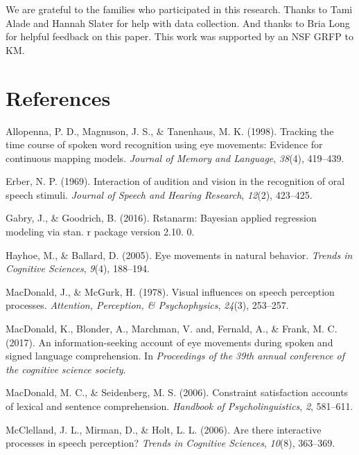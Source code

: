 \documentclass[10pt, letterpaper]{article}
\begin{document}
We are grateful to the families who participated in this research.
Thanks to Tami Alade and Hannah Slater for help with data collection.
And thanks to Bria Long for helpful feedback on this paper. This work
was supported by an NSF GRFP to KM.

\section{References}\label{references}

\setlength{\parindent}{-0.1in} \setlength{\leftskip}{0.125in} \noindent

\hypertarget{refs}{}
\hypertarget{ref-allopenna1998tracking}{}
Allopenna, P. D., Magnuson, J. S., \& Tanenhaus, M. K. (1998). Tracking
the time course of spoken word recognition using eye movements: Evidence
for continuous mapping models. \emph{Journal of Memory and Language},
\emph{38}(4), 419--439.

\hypertarget{ref-erber1969interaction}{}
Erber, N. P. (1969). Interaction of audition and vision in the
recognition of oral speech stimuli. \emph{Journal of Speech and Hearing
Research}, \emph{12}(2), 423--425.

\hypertarget{ref-gabry2016rstanarm}{}
Gabry, J., \& Goodrich, B. (2016). Rstanarm: Bayesian applied regression
modeling via stan. r package version 2.10. 0.

\hypertarget{ref-hayhoe2005eye}{}
Hayhoe, M., \& Ballard, D. (2005). Eye movements in natural behavior.
\emph{Trends in Cognitive Sciences}, \emph{9}(4), 188--194.

\hypertarget{ref-macdonald1978visual}{}
MacDonald, J., \& McGurk, H. (1978). Visual influences on speech
perception processes. \emph{Attention, Perception, \& Psychophysics},
\emph{24}(3), 253--257.

\hypertarget{ref-macdonald2017info}{}
MacDonald, K., Blonder, A., Marchman, V. and, Fernald, A., \& Frank, M.
C. (2017). An information-seeking account of eye movements during spoken
and signed language comprehension. In \emph{Proceedings of the 39th
annual conference of the cognitive science society}.

\hypertarget{ref-macdonald2006constraint}{}
MacDonald, M. C., \& Seidenberg, M. S. (2006). Constraint satisfaction
accounts of lexical and sentence comprehension. \emph{Handbook of
Psycholinguistics}, \emph{2}, 581--611.

\hypertarget{ref-mcclelland2006there}{}
McClelland, J. L., Mirman, D., \& Holt, L. L. (2006). Are there
interactive processes in speech perception? \emph{Trends in Cognitive
Sciences}, \emph{10}(8), 363--369.
\end{document}
